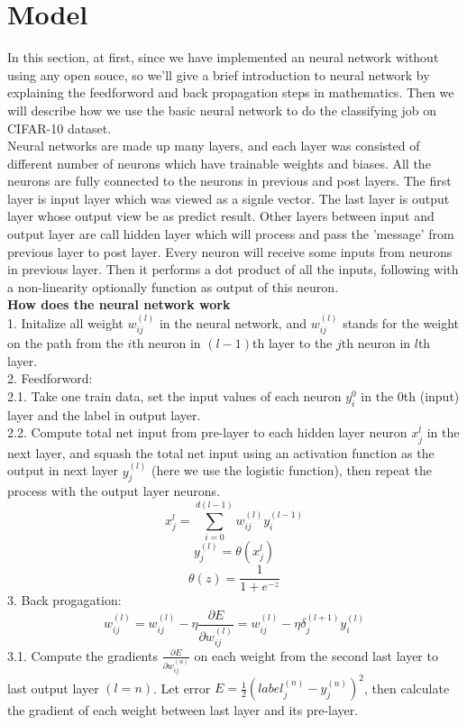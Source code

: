 \documentclass[11pt,letterpaper]{article}
\begin{document}
\section{Model}
In this section, at first, since we have implemented an neural network without using any open souce, so we'll give a brief introduction to neural network by explaining the feedforword and back propagation steps in mathematics. Then we will describe how we use the basic neural network to do the classifying job on CIFAR-10 dataset.\\
Neural networks are made up many layers, and each layer was consisted of different number of neurons which have trainable weights and biases. All the neurons are fully connected to the neurons in previous and post layers. The first layer is input layer which was viewed as a signle vector. The last layer is output layer whose output view be as predict result. Other layers between input and output layer are call hidden layer which will process and pass the 'message' from previous layer to post layer. Every neuron will receive some inputs from neurons in previous layer. Then it performs a dot product of all the inputs, following with a non-linearity optionally function as output of this neuron. \\
{\bf How does the neural network work}\\
1. Initalize all weight $w^{(l)}_{ij}$ in the neural network, and $w^{(l)}_{ij}$ stands for the weight on the path from the $i$th neuron in $(l-1)$th layer to the $j$th neuron in $l$th layer.\\
2. Feedforword:\\
2.1. Take one train data, set the input values of each neuron $y^0_{i}$ in the $0$th (input) layer and the label in output layer.\\
2.2. Compute total net input from pre-layer to each hidden layer neuron $x^{l}_{j}$ in the next layer, and squash the total net input using an activation function as the output in next layer $y^{(l)}_{j}$ (here we use the logistic function), then repeat the process with the output layer neurons.
$$x^{l}_{j} = \sum^{d(l-1)}_{i=0}w^{(l)}_{ij}y^{(l-1)}_{i}$$
$$y^{(l)}_{j} = \theta(x^{l}_{j})$$
$$\theta(z) = \frac{1}{1+e^{-z}}$$
3. Back progagation:\\
$$w^{(l)}_{ij} = w^{(l)}_{ij} - \eta \frac{\partial E}{\partial w^{(l)}_{ij}} = w^{(l)}_{ij} - \eta \delta^{(l+1)}_{j}y^{(l)}_{i}$$
3.1. Compute the gradients $\frac{\partial E}{\partial w^{(n)}_{ij}}$ on each weight from the second last layer to last output layer $(l = n)$. Let error $E = \frac{1}{2}(label^{(n)}_{j}-y^{(n)}_{j})^2$, then calculate the gradient of each weight between last layer and its pre-layer.
\end{document}
